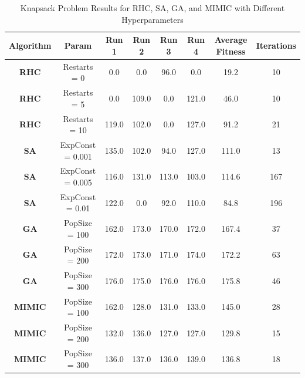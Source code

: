 \begin{table}[h!]
    \centering
    \caption{Knapsack Problem Results for RHC, SA, GA, and MIMIC with Different Hyperparameters}
    \begin{tabular}{|c|c|c|c|c|c|c|c|}
        \hline
        \textbf{Algorithm} & \textbf{Param} & \textbf{Run 1} & \textbf{Run 2} & \textbf{Run 3} & \textbf{Run 4} & \textbf{Average Fitness} & \textbf{Iterations} \\ \hline
        
        \textbf{RHC} & Restarts = 0 & 0.0 & 0.0 & 96.0 & 0.0 & 19.2 & 10 \\ \hline
        \textbf{RHC} & Restarts = 5 & 0.0 & 109.0 & 0.0 & 121.0 & 46.0 & 10 \\ \hline
        \textbf{RHC} & Restarts = 10 & 119.0 & 102.0 & 0.0 & 127.0 & 91.2 & 21 \\ \hline
        
        \textbf{SA} & ExpConst = 0.001 & 135.0 & 102.0 & 94.0 & 127.0 & 111.0 & 13 \\ \hline
        \textbf{SA} & ExpConst = 0.005 & 116.0 & 131.0 & 113.0 & 103.0 & 114.6 & 167 \\ \hline
        \textbf{SA} & ExpConst = 0.01 & 122.0 & 0.0 & 92.0 & 110.0 & 84.8 & 196 \\ \hline
        
        \textbf{GA} & PopSize = 100 & 162.0 & 173.0 & 170.0 & 172.0 & 167.4 & 37 \\ \hline
        \textbf{GA} & PopSize = 200 & 172.0 & 173.0 & 171.0 & 174.0 & 172.2 & 63 \\ \hline
        \textbf{GA} & PopSize = 300 & 176.0 & 175.0 & 176.0 & 176.0 & 175.8 & 46 \\ \hline
        
        \textbf{MIMIC} & PopSize = 100 & 162.0 & 128.0 & 131.0 & 133.0 & 145.0 & 28 \\ \hline
        \textbf{MIMIC} & PopSize = 200 & 132.0 & 136.0 & 127.0 & 127.0 & 129.8 & 15 \\ \hline
        \textbf{MIMIC} & PopSize = 300 & 136.0 & 137.0 & 136.0 & 139.0 & 136.8 & 18 \\ \hline
        
    \end{tabular}
    \label{tab:knapsack_results}
\end{table}
